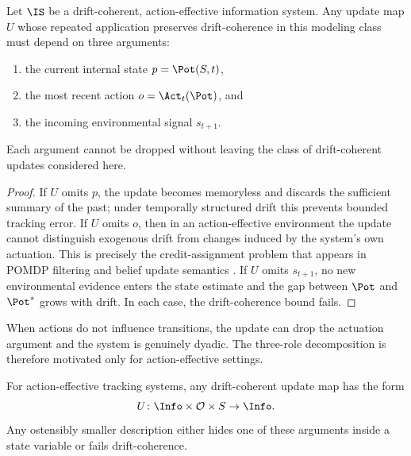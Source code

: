 \begin{lemma}\label{lem:beliefupdate}
Let $\IS$ be a drift-coherent, action-effective information system. Any update
map $U$ whose repeated application preserves drift-coherence in this modeling
class must
depend on three arguments:
\begin{enumerate}[label=\textnormal{(\roman*)}]
  \item the current internal state $p = \Pot(S,t)$,
  \item the most recent action $o = \Act_t(\Pot)$, and
  \item the incoming environmental signal $s_{t+1}$.
\end{enumerate}
Each argument cannot be dropped without leaving the class of drift-coherent
updates considered here.
\end{lemma}

\begin{proof}
If $U$ omits $p$, the update becomes memoryless and discards the sufficient
summary of the past; under temporally structured drift this prevents bounded
tracking error. If $U$ omits $o$, then in an action-effective environment the
update cannot distinguish exogenous drift from changes induced by the system's
own actuation. This is precisely the credit-assignment problem that appears in
POMDP filtering and belief update semantics
\citep{kaelbling1998,KatsunaMendelzon1992,Bonanno2024}. If $U$ omits
$s_{t+1}$, no new environmental evidence enters the state estimate and the gap
between $\Pot$ and $\Pot^*$ grows with drift. In each case, the
drift-coherence bound fails.
\end{proof}

\begin{remark}\label{rem:passive}
When actions do not influence transitions, the update can drop the actuation
argument and the system is genuinely dyadic. The three-role decomposition is
therefore motivated only for action-effective settings.
\end{remark}

\begin{corollary}\label{cor:ternary}
For action-effective tracking systems, any drift-coherent update map has the
form
\[
  U\colon \Info \times \mathcal{O} \times S \to \Info.
\]
Any ostensibly smaller description either hides one of these arguments inside a
state variable or fails drift-coherence.
\end{corollary}

